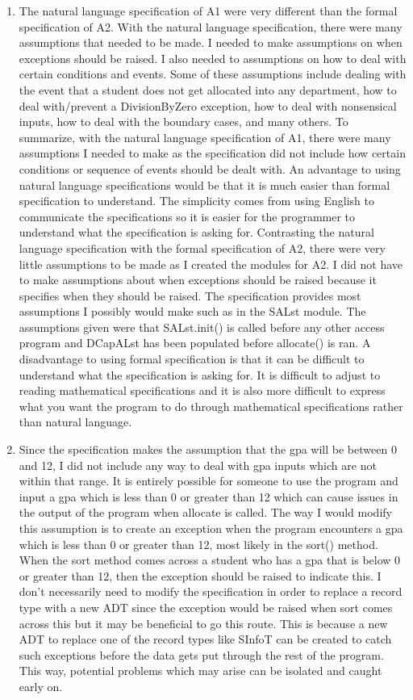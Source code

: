 \documentclass[12pt]{article}
\begin{document}
\begin{enumerate}

\item The natural language specification of A1 were very different than the formal specification of A2. With the natural language specification, there were many assumptions that needed to be made. I needed to make assumptions on when exceptions should be raised. I also needed to assumptions on how to deal with certain conditions and events. Some of these assumptions include dealing with the event that a student does not get allocated into any department, how to deal with/prevent a DivisionByZero exception, how to deal with nonsensical inputs, how to deal with the boundary cases, and many others. To summarize, with the natural language specification of A1, there were many assumptions I needed to make as the specification did not include how certain conditions or sequence of events should be dealt with. An advantage to using natural language specifications would be that it is much easier than formal specification to understand. The simplicity comes from using English to communicate the specifications so it is easier for the programmer to understand what the specification is asking for. Contrasting the natural language specification with the formal specification of A2, there were very little assumptions to be made as I created the modules for A2. I did not have to make assumptions about when exceptions should be raised because it specifies when they should be raised. The specification provides most assumptions I possibly would make such as in the SALst module. The assumptions given were that SALst.init() is called before any other access program and DCapALst has been populated before allocate() is ran. A disadvantage to using formal specification is that it can be difficult to understand what the specification is asking for. It is difficult to adjust to reading mathematical specifications and it is also more difficult to express what you want the program to do through mathematical specifications rather than natural language.

\item Since the specification makes the assumption that the gpa will be between 0 and 12, I did not include any way to deal with gpa inputs which are not within that range. It is entirely possible for someone to use the program and input a gpa which is less than 0 or greater than 12 which can cause issues in the output of the program when allocate is called. The way I would modify this assumption is to create an exception when the program encounters a gpa which is less than 0 or greater than 12, most likely in the sort() method. When the sort method comes across a student who has a gpa that is below 0 or greater than 12, then the exception should be raised to indicate this. I don’t necessarily need to modify the specification in order to replace a record type with a new ADT since the exception would be raised when sort comes across this but it may be beneficial to go this route. This is because a new ADT to replace one of the record types like SInfoT can be created to catch such exceptions before the data gets put through the rest of the program. This way, potential problems which may arise can be isolated and caught early on.


\end{enumerate}
\end{document}
